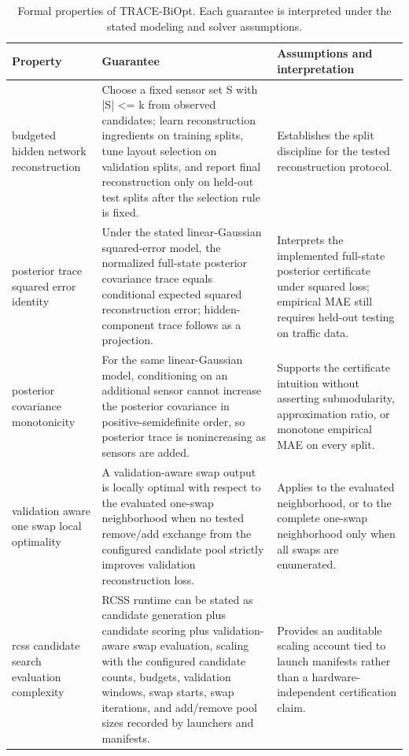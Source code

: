 \begin{table}[pos=htbp]
\centering
\caption{Formal properties of TRACE-BiOpt. Each guarantee is interpreted under the stated modeling and solver assumptions.}
\label{tab:theory}
\small
\begin{tabular}{p{}p{}p{}}
\toprule
Property & Guarantee & Assumptions and interpretation \\
\midrule
budgeted hidden network reconstruction & Choose a fixed sensor set S with |S| <= k from observed candidates; learn reconstruction ingredients on training splits, tune layout selection on validation splits, and report final reconstruction only on held-out test splits after the selection rule is fixed. & Establishes the split discipline for the tested reconstruction protocol. \\
posterior trace squared error identity & Under the stated linear-Gaussian squared-error model, the normalized full-state posterior covariance trace equals conditional expected squared reconstruction error; hidden-component trace follows as a projection. & Interprets the implemented full-state posterior certificate under squared loss; empirical MAE still requires held-out testing on traffic data. \\
posterior covariance monotonicity & For the same linear-Gaussian model, conditioning on an additional sensor cannot increase the posterior covariance in positive-semidefinite order, so posterior trace is nonincreasing as sensors are added. & Supports the certificate intuition without asserting submodularity, approximation ratio, or monotone empirical MAE on every split. \\
validation aware one swap local optimality & A validation-aware swap output is locally optimal with respect to the evaluated one-swap neighborhood when no tested remove/add exchange from the configured candidate pool strictly improves validation reconstruction loss. & Applies to the evaluated neighborhood, or to the complete one-swap neighborhood only when all swaps are enumerated. \\
rcss candidate search evaluation complexity & RCSS runtime can be stated as candidate generation plus candidate scoring plus validation-aware swap evaluation, scaling with the configured candidate counts, budgets, validation windows, swap starts, swap iterations, and add/remove pool sizes recorded by launchers and manifests. & Provides an auditable scaling account tied to launch manifests rather than a hardware-independent certification claim. \\
\bottomrule
\end{tabular}
\end{table}

